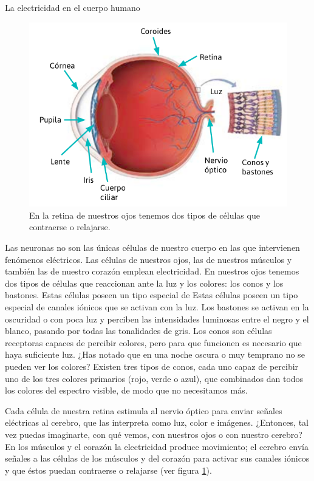 \begin{sectionbox}{La electricidad en el cuerpo humano}
    \begin{minipage}{0.55\textwidth}
        \begin{figure}[H]
            \centering
            \includegraphics[width=0.9\linewidth]{../images/20230502025101}
            \caption{En la retina de nuestros ojos tenemos dos tipos de células que contraerse o relajarse. }
            \label{fig:20230502025101}
        \end{figure}
    \end{minipage}\hfill
    \begin{minipage}{0.4\textwidth}
        Las neuronas no son las únicas células de nuestro cuerpo en las que intervienen fenómenos eléctricos.
        Las células de nuestros ojos, las de nuestros músculos y también las de nuestro corazón emplean electricidad.
        En nuestros ojos tenemos dos tipos de células que reaccionan ante la luz y los colores: los conos y los bastones. Estas células poseen un tipo especial de
        Estas células poseen un tipo especial de canales iónicos que se activan con la luz. Los bastones se activan
        en la oscuridad o con poca luz y perciben las intensidades luminosas entre el negro y el blanco, pasando por todas las tonalidades de gris. Los conos son células receptoras capaces de percibir
        colores, pero para que funcionen es necesario que haya suficiente
        luz. ¿Has notado que en una noche oscura o muy temprano no
        se pueden ver los colores? Existen tres tipos de conos, cada uno capaz de percibir uno de los tres colores primarios
        (rojo, verde o azul), que combinados dan todos los colores del espectro visible, de modo que no necesitamos más.
    \end{minipage}

    Cada célula de nuestra retina estimula al nervio óptico para enviar señales eléctricas al cerebro, que las interpreta como luz, color e imágenes.
    ¿Entonces, tal vez puedas imaginarte, con qué vemos, con nuestros ojos o con nuestro cerebro?
    En los músculos y el corazón la electricidad produce movimiento; el cerebro envía señales a las células de los músculos y del corazón para activar sus canales iónicos y que éstos puedan contraerse o relajarse (ver figura \ref{fig:20230502025101}).
\end{sectionbox}
